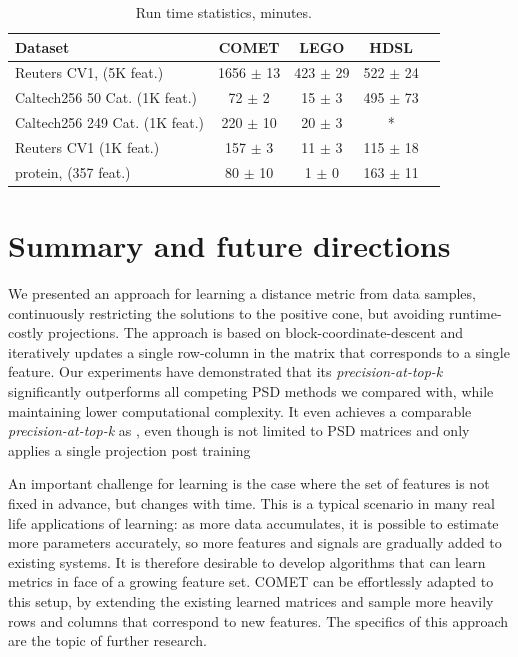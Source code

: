 \documentclass{article} %
\begin{document}
\begin{table}[t]
\caption{Run time statistics, minutes.}
\label{runtimes}
\vskip 0.15in
\begin{center}
\begin{small}
\begin{sc}
\begin{tabular}{lcccr}
\hline
Dataset     & COMET           & LEGO            & HDSL             \\ 
\hline
Reuters CV1, (5K feat.)&  1656 $\pm$    13 &   423 $\pm$    29 &   522 $\pm$    24  \\ 
Caltech256 50 Cat. (1K feat.)  &    72 $\pm$     2 &    15 $\pm$     3 &   495 $\pm$    73  \\ 
Caltech256 249 Cat. (1K feat.) &   220 $\pm$    10 &    20 $\pm$     3 &        *        \\
Reuters CV1 (1K feat.) &   157 $\pm$     3 &    11 $\pm$     3 &   115 $\pm$    18  \\ 
protein, (357 feat.)  &    80 $\pm$    10 &     1 $\pm$     0 &   163 $\pm$    11 \\ 
\hline
\end{tabular}
\end{sc}
\end{small}
\end{center}
\vskip -0.1in
\end{table}

\section{Summary and future directions}
We presented an approach for learning a distance metric from data samples, continuously restricting the solutions to the positive cone, but avoiding runtime-costly projections. The approach is based on block-coordinate-descent and iteratively updates a single row-column in the matrix that corresponds to a single feature. Our experiments have demonstrated that its \textit{precision-at-top-k} significantly outperforms all competing PSD methods we compared with, while maintaining lower computational complexity. It even achieves a comparable \textit{precision-at-top-k} as \cite{OASIS}, even though \cite{OASIS} is not limited to PSD matrices and only applies a single projection post training

An important challenge for learning is the case where the set of features is not fixed in advance, but changes with time. This is a typical scenario in many real life applications of learning: as more data accumulates, it is possible to estimate more parameters accurately, so more features and signals are gradually added to existing systems. It is therefore desirable to develop algorithms that can learn metrics in face of a growing feature set. COMET can be effortlessly adapted to this setup, by extending the existing learned matrices and sample more heavily rows and columns that correspond to new features. The specifics of this approach are the topic of further research.


\newpage

\small{

%
}
\end{document}
